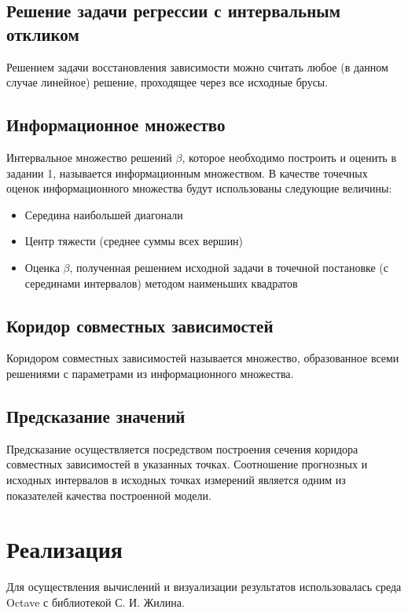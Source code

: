 \documentclass[a4paper]{article}
\begin{document}
\subsection{Решение задачи регрессии с интервальным откликом}
Решением задачи восстановления зависимости можно считать любое (в данном случае линейное) решение, проходящее через все исходные брусы.
\subsection{Информационное множество}
Интервальное множество решений $\beta$, которое необходимо построить и оценить в задании 1, называется информационным множеством.
В качестве точечных оценок информационного множества будут использованы следующие величины:
\begin{itemize}
    \item Середина наибольшей диагонали
    \item Центр тяжести (среднее суммы всех вершин)
    \item Оценка $\beta$, полученная решением исходной задачи в точечной постановке (с серединами интервалов) методом наименьших квадратов
\end{itemize}
\subsection{Коридор совместных зависимостей}
Коридором совместных зависимостей называется множество, образованное всеми решениями с параметрами из информационного множества.
\subsection{Предсказание значений}
Предсказание осуществляется посредством построения сечения коридора совместных зависимостей в указанных точках.
Соотношение прогнозных и исходных интервалов в исходных точках измерений является одним из показателей качества построенной модели.
\section{Реализация}
Для осуществления вычислений и визуализации результатов использовалась среда Octave с библиотекой С. И. Жилина.
\end{document}
